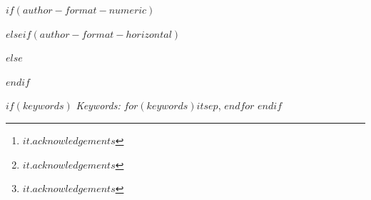 $if(author-format-numeric)$
\author{%
\parbox{0.95\textwidth}{\centering
$for(by-author)$
  $it.name.literal$\textsuperscript{$for(it.affiliations)$$it.number$$sep$,$endfor$}$if(it.acknowledgements)$\thanks{$it.acknowledgements$}$endif$$sep$ \quad
$endfor$
  \\[0.6em]
  \small
$for(by-affiliation)$
  \textsuperscript{$it.number$}\,$if(it.department)$$it.department$, $endif$$if(it.name)$$it.name$$endif$$sep$\\
$endfor$
}%
}
$elseif(author-format-horizontal)$
\author{
$for(by-author)$
$it.name.literal$$if(it.acknowledgements)$\thanks{$it.acknowledgements$}$endif$\\
$for(it.affiliations)$$if(it.department)$$it.department$$if(it.name)$, $endif$$endif$$if(it.name)$$it.name$$endif$$if(it.department)$\\$elseif(it.name)$\\$endif$
$endfor$$sep$\and $endfor$
}
$else$
\author{
$for(by-author)$
$it.name.literal$$if(it.acknowledgements)$\thanks{$it.acknowledgements$}$endif$\\
$for(it.affiliations)$$if(it.department)$$it.department$$if(it.name)$, $endif$$endif$$if(it.name)$$it.name$$endif$$if(it.department)$\\$elseif(it.name)$\\$endif$
$endfor$$sep$\\$endfor$
}
$endif$

\maketitle

\bigskip
\bigskip
\begin{abstract}
$abstract$
\end{abstract}

\bigskip
$if(keywords)$
\noindent%
{\it Keywords:} $for(keywords)$$it$$sep$, $endfor$
\vfill
$endif$

\newpage
{} %
